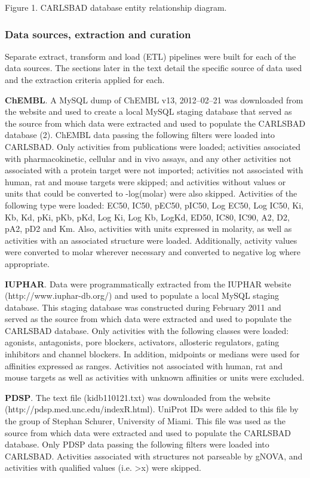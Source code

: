 Figure 1.
CARLSBAD database entity relationship diagram.

\subsubsection{Data sources, extraction and curation}

Separate extract, transform and load (ETL) pipelines were built for each of the data sources. The sections later in the text detail the specific source of data used and the extraction criteria applied for each.

\textbf{ChEMBL}. A MySQL dump of ChEMBL v13, 2012–02–21 was downloaded from the website and used to create a local MySQL staging database that served as the source from which data were extracted and used to populate the CARLSBAD database (2). ChEMBL data passing the following filters were loaded into CARLSBAD. Only activities from publications were loaded; activities associated with pharmacokinetic, cellular and in vivo assays, and any other activities not associated with a protein target were not imported; activities not associated with human, rat and mouse targets were skipped; and activities without values or units that could be converted to -log(molar) were also skipped. Activities of the following type were loaded: EC50, IC50, pEC50, pIC50, Log EC50, Log IC50, Ki, Kb, Kd, pKi, pKb, pKd, Log Ki, Log Kb, LogKd, ED50, IC80, IC90, A2, D2, pA2, pD2 and Km. Also, activities with units expressed in molarity, as well as activities with an associated structure were loaded. Additionally, activity values were converted to molar wherever necessary and converted to negative log where appropriate.

\textbf{IUPHAR}. Data were programmatically extracted from the IUPHAR website (http://www.iuphar-db.org/) and used to populate a local MySQL staging database. This staging database was constructed during February 2011 and served as the source from which data were extracted and used to populate the CARLSBAD database. Only activities with the following classes were loaded: agonists, antagonists, pore blockers, activators, allosteric regulators, gating inhibitors and channel blockers. In addition, midpoints or medians were used for affinities expressed as ranges. Activities not associated with human, rat and mouse targets as well as activities with unknown affinities or units were excluded.

\textbf{PDSP}. The text file (kidb110121.txt) was downloaded from the website (http://pdsp.med.unc.edu/indexR.html). UniProt IDs were added to this file by the group of Stephan Schurer, University of Miami. This file was used as the source from which data were extracted and used to populate the CARLSBAD database. Only PDSP data passing the following filters were loaded into CARLSBAD. Activities associated with structures not parseable by gNOVA, and activities with qualified values (i.e. \textgreater x) were skipped.

